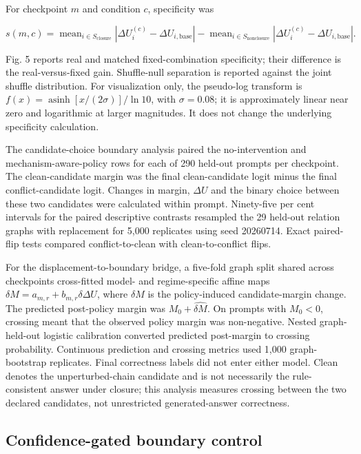 \documentclass[12pt]{article}
\begin{document}
For checkpoint \(m\) and condition \(c\), specificity was

\[
s(m,c)=\operatorname{mean}_{i\in S_{\mathrm{closure}}}|\Delta U_i^{(c)}-\Delta U_{i,\mathrm{base}}|-\operatorname{mean}_{i\in S_{\mathrm{nonclosure}}}|\Delta U_i^{(c)}-\Delta U_{i,\mathrm{base}}|.
\]

Fig. 5 reports real and matched fixed-combination specificity; their difference is the real-versus-fixed gain. Shuffle-null separation is reported against the joint shuffle distribution. For visualization only, the pseudo-log transform is \(f(x)=\operatorname{asinh}[x/(2\sigma)]/\ln 10\), with \(\sigma=0.08\); it is approximately linear near zero and logarithmic at larger magnitudes. It does not change the underlying specificity calculation.

The candidate-choice boundary analysis paired the no-intervention and mechanism-aware-policy rows for each of 290 held-out prompts per checkpoint. The clean-candidate margin was the final clean-candidate logit minus the final conflict-candidate logit. Changes in margin, \(\Delta U\) and the binary choice between these two candidates were calculated within prompt. Ninety-five per cent intervals for the paired descriptive contrasts resampled the 29 held-out relation graphs with replacement for 5,000 replicates using seed 20260714. Exact paired-flip tests compared conflict-to-clean with clean-to-conflict flips.

For the displacement-to-boundary bridge, a five-fold graph split shared across checkpoints cross-fitted model- and regime-specific affine maps \(\delta M=a_{m,r}+b_{m,r}\delta\Delta U\), where \(\delta M\) is the policy-induced candidate-margin change. The predicted post-policy margin was \(M_{0}+\widehat{\delta M}\). On prompts with \(M_0<0\), crossing meant that the observed policy margin was non-negative. Nested graph-held-out logistic calibration converted predicted post-margin to crossing probability. Continuous prediction and crossing metrics used 1,000 graph-bootstrap replicates. Final correctness labels did not enter either model. Clean denotes the unperturbed-chain candidate and is not necessarily the rule-consistent answer under closure; this analysis measures crossing between the two declared candidates, not unrestricted generated-answer correctness.

\subsection*{Confidence-gated boundary control}
\end{document}

